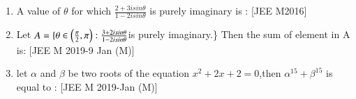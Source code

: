 \documentclass[journal,12pt,twocolumn,article]{IEEEtran}
\theoremstyle{remark}
\begin{document}
\begin{enumerate}[start = 14]
\item A value of $\theta$ for which $\frac{2+3isin\theta}{1-2isin\theta}$ is purely imaginary is :      
\hfill{[JEE M2016]}

\begin{enumerate}
\end{enumerate}                                     

\item Let  $A=\{\theta \in \left(\frac{\pi}{2},\pi\right):\frac{3+2isin\theta}{1-2isin\theta}$is purely imaginary.\} Then the sum of element in A is:
\hfill{[JEE M 2019-9 Jan (M)]}
\begin{enumerate}
\end{enumerate}

\item let $\alpha$ and $\beta$ be two roots of the equation $x^2+2x+2=0$,then $\alpha^{15}+\beta^{15}$ is equal to :                                       
\hfill{[JEE M 2019-Jan (M)]}                       
\begin{enumerate}                                   
\end{enumerate}


\end{enumerate}
\end{document}
